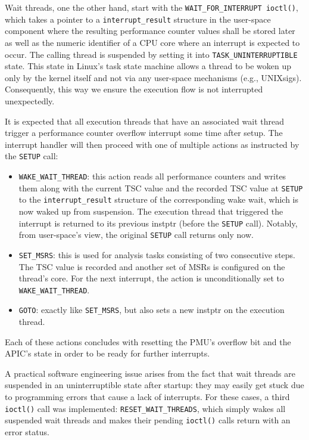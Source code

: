 Wait threads, one the other hand, start with the \texttt{WAIT\_FOR\_INTERRUPT ioctl()}, which takes a pointer to a \texttt{interrupt\_result} structure in the user-space component where the resulting performance counter values shall be stored later as well as the numeric identifier of a \gls{CPU} core where an interrupt is expected to occur. The calling thread is suspended by setting it into \texttt{TASK\_UNINTERRUPTIBLE} state. This state \cite{kernelschedheader} in Linux's task state machine allows a thread to be woken up only by the kernel itself and not via any user-space mechanisms (e.g., \glspl{UNIXsig}). Consequently, this way we ensure the execution flow is not interrupted unexpectedly.

It is expected that all execution threads that have an associated wait thread trigger a performance counter overflow interrupt some time after setup. The interrupt handler will then proceed with one of multiple actions as instructed by the \texttt{SETUP} call:

\begin{itemize}
	\item \texttt{WAKE\_WAIT\_THREAD}: this action reads all performance counters and writes them along with the current \gls{TSC} value and the recorded \gls{TSC} value at \texttt{SETUP} to the \texttt{interrupt\_result} structure of the corresponding wake wait, which is now waked up from suspension. The execution thread that triggered the interrupt is returned to its previous \acrlong{instptr} (before the \texttt{SETUP} call). Notably, from user-space's view, the original \texttt{SETUP} call returns only now.
	\item \texttt{SET\_MSRS}: this is used for analysis tasks consisting of two consecutive steps. The \gls{TSC} value is recorded and another set of \glspl{MSR} is configured on the thread's core. For the next interrupt, the action is unconditionally set to \texttt{WAKE\_WAIT\_THREAD}.
	\item \texttt{GOTO}: exactly like \texttt{SET\_MSRS}, but also sets a new \acrlong{instptr} on the execution thread.
\end{itemize}

Each of these actions concludes with resetting the \gls{PMU}'s overflow bit and the \gls{APIC}'s state in order to be ready for further interrupts.

A practical software engineering issue arises from the fact that wait threads are suspended in an uninterruptible state after startup: they may easily get stuck due to programming errors that cause a lack of interrupts. For these cases, a third \texttt{ioctl()} call was implemented: \texttt{RESET\_WAIT\_THREADS}, which simply wakes all suspended wait threads and makes their pending \texttt{ioctl()} calls return with an error status.

